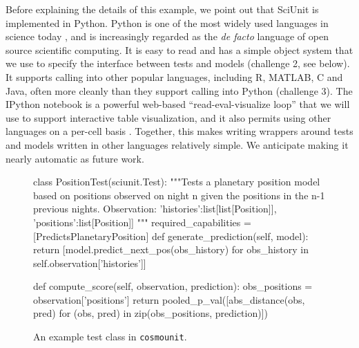 \documentclass[9pt]{sig-alternate}
\begin{document}
Before explaining the details of this example, we point out that SciUnit is implemented in Python. Python is one of the most widely used languages in science today \cite{sanner1999python}, and is increasingly regarded as the \textit{de facto} language of open source scientific computing. It is easy to read and has a simple object system that we use to specify the interface between tests and models (challenge 2, see below). It supports calling into other popular languages, including R, MATLAB, C and Java, often more cleanly than they support calling into Python (challenge 3). The IPython notebook is a powerful web-based ``read-eval-visualize loop'' that we will use to support interactive table visualization, and it also permits using other languages on a per-cell basis \cite{ipynb}. Together, this makes writing wrappers around tests and models written in other languages relatively simple. We anticipate making it nearly automatic as future work.
\begin{figure}[t]
\small
%
%
\begin{python}
class PositionTest(sciunit.Test):
  """Tests a planetary position model based on positions observed on night n given the positions in the n-1 previous nights.
  Observation: {
    'histories':list[list[Position]], 
    'positions':list[Position]]
  }"""
  required_capabilities = [PredictsPlanetaryPosition]
  def generate_prediction(self, model):
    return [model.predict_next_pos(obs_history)
      for obs_history 
      in self.observation['histories']]

  def compute_score(self, observation, prediction):
    obs_positions = observation['positions']
    return pooled_p_val([abs_distance(obs, pred)
      for (obs, pred) 
      in zip(obs_positions, prediction)])
\end{python}
\vspace{-12px}
\caption{\small An example test class in \texttt{cosmounit}.}
\label{fig:rate_test}
\vspace{-15px}
\end{figure}
\end{document}
